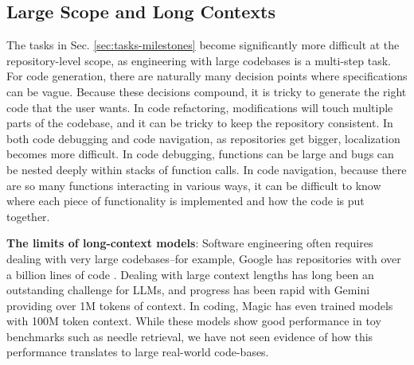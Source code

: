 \subsection{Large Scope and Long Contexts} \label{sec:c-long-context-retrieval}

\vspace{-0.1cm}

The tasks in Sec. \ref{sec:tasks-milestones} become significantly more difficult at the repository-level scope, as engineering with large codebases is a multi-step task. For code generation, there are naturally many decision points where specifications can be vague. Because these decisions compound, it is tricky to generate the right code that the user wants. In code refactoring, modifications will touch multiple parts of the codebase, and it can be tricky to keep the repository consistent. In both code debugging and code navigation, as repositories get bigger, localization becomes more difficult. In code debugging, functions can be large and bugs can be nested deeply within stacks of function calls. In code navigation, because there are so many functions interacting in various ways, it can be difficult to know where each piece of functionality is implemented and how the code is put together.

\textbf{The limits of long-context models}: Software engineering often requires dealing with very large codebases--for example, Google has repositories with over a billion lines of code \citep{potvin2016google}. 
Dealing with large context lengths has long been an outstanding challenge for LLMs, and progress has been rapid with Gemini providing over 1M tokens of context. 
In coding, Magic has even trained models with 100M token context.
While these models show good performance in toy benchmarks such as needle retrieval, we have not seen evidence of how this performance translates to large real-world code-bases.





